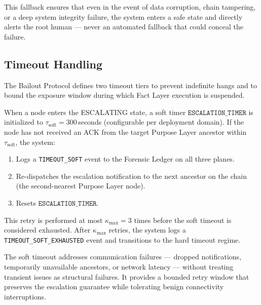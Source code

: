 This fallback ensures that even in the event of data corruption, chain tampering, or a deep system integrity failure, the system enters a safe state and directly alerts the root human — never an automated fallback that could conceal the failure.

\subsection{Timeout Handling}
\label{sec:timeout}

The Bailout Protocol defines two timeout tiers to prevent indefinite hangs and to bound the exposure window during which Fact Layer execution is suspended.

\begin{definition}
\label{def:soft-timeout}
When a node enters the ESCALATING state, a soft timer $\texttt{ESCALATION\_TIMER}$ is initialized to $\tau_{\text{soft}} = 300\,$seconds (configurable per deployment domain). If the node has not received an ACK from the target Purpose Layer ancestor within $\tau_{\text{soft}}$, the system:

\begin{enumerate}[noitemsep]
    \item Logs a \texttt{TIMEOUT\_SOFT} event to the Forensic Ledger on all three planes.
    \item Re-dispatches the escalation notification to the next ancestor on the chain (the second-nearest Purpose Layer node).
    \item Resets $\texttt{ESCALATION\_TIMER}$.
\end{enumerate}

This retry is performed at most $\kappa_{\text{max}} = 3$ times before the soft timeout is considered exhausted. After $\kappa_{\text{max}}$ retries, the system logs a \texttt{TIMEOUT\_SOFT\_EXHAUSTED} event and transitions to the hard timeout regime.
\end{definition}

The soft timeout addresses communication failures — dropped notifications, temporarily unavailable ancestors, or network latency — without treating transient issues as structural failures. It provides a bounded retry window that preserves the escalation guarantee while tolerating benign connectivity interruptions.

